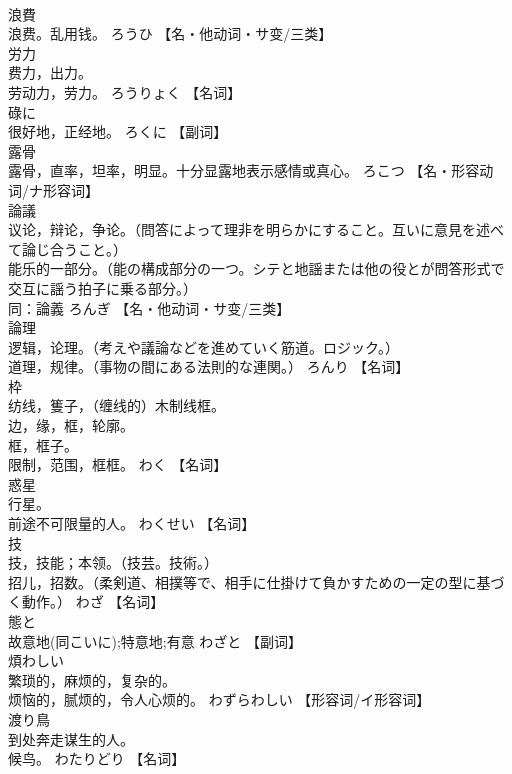 \documentclass[8pt]{extreport}
\begin{document}
\begin{CJK}{UTF8}{min}
\\	浪費	
\\	浪费。乱用钱。	ろうひ		【名・他动词・サ变/三类】
\\	労力	
\\	费力，出力。 
\\	劳动力，劳力。	ろうりょく		【名词】
\\	碌に	
\\	很好地，正经地。	ろくに		【副词】
\\	露骨	
\\	露骨，直率，坦率，明显。十分显露地表示感情或真心。	ろこつ		【名・形容动词/ナ形容词】
\\	論議	
\\	议论，辩论，争论。（問答によって理非を明らかにすること。互いに意見を述べて論じ合うこと。） 
\\	能乐的一部分。（能の構成部分の一つ。シテと地謡または他の役とが問答形式で交互に謡う拍子に乗る部分。） 
\\	同：論義	ろんぎ		【名・他动词・サ变/三类】
\\	論理	
\\	逻辑，论理。（考えや議論などを進めていく筋道。ロジック。） 
\\	道理，规律。（事物の間にある法則的な連関。）	ろんり		【名词】
\\	枠	
\\	纺线，篗子，（缠线的）木制线框。 
\\	边，缘，框，轮廓。 
\\	框，框子。 
\\	限制，范围，框框。	わく		【名词】
\\	惑星	
\\	行星。 
\\	前途不可限量的人。	わくせい		【名词】
\\	技	
\\	技，技能；本领。（技芸。技術。） 
\\	招儿，招数。（柔剣道、相撲等で、相手に仕掛けて負かすための一定の型に基づく動作。）	わざ		【名词】
\\	態と	
\\	故意地(同こいに);特意地;有意	わざと		【副词】
\\	煩わしい	
\\	繁琐的，麻烦的，复杂的。 
\\	烦恼的，腻烦的，令人心烦的。	わずらわしい		【形容词/イ形容词】
\\	渡り鳥	
\\	到处奔走谋生的人。 
\\	候鸟。	わたりどり		【名词】

\end{CJK}
\end{document}
